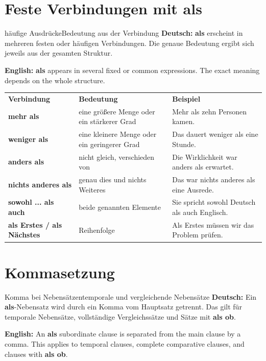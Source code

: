 \documentclass[a4paper,11pt]{article}
\newcommand{\GermanText}[1]{\textbf{Deutsch: }#1\par}
\newcommand{\EnglishText}[1]{{\small\color{SoftGray}\textbf{English: }#1\par}}
\begin{document}
    \section{Feste Verbindungen mit \glqq als\grqq}

        \begin{grammarentry}{häufige Ausdrücke}{Bedeutung aus der Verbindung}
            \GermanText{\textbf{als} erscheint in mehreren festen oder häufigen Verbindungen. Die genaue Bedeutung ergibt sich jeweils aus der gesamten Struktur.}
            \EnglishText{\textbf{als} appears in several fixed or common expressions. The exact meaning depends on the whole structure.}
        \end{grammarentry}

        \begin{longtable}{>{\bfseries}p{4.0cm}|p{5.5cm}|p{5.6cm}}
            \rowcolor{HeaderBlueDark}
            \color{white}\textbf{Verbindung} &
            \color{white}\textbf{Bedeutung} &
            \color{white}\textbf{Beispiel} \\
            mehr als & eine größere Menge oder ein stärkerer Grad & Mehr als zehn Personen kamen. \\
            weniger als & eine kleinere Menge oder ein geringerer Grad & Das dauert weniger als eine Stunde. \\
            anders als & nicht gleich, verschieden von & Die Wirklichkeit war anders als erwartet. \\
            nichts anderes als & genau dies und nichts Weiteres & Das war nichts anderes als eine Ausrede. \\
            sowohl ... als auch & beide genannten Elemente & Sie spricht sowohl Deutsch als auch Englisch. \\
            als Erstes / als Nächstes & Reihenfolge & Als Erstes müssen wir das Problem prüfen. \\
        \end{longtable}

    \section{Kommasetzung}

        \begin{grammarentry}{Komma bei Nebensätzen}{temporale und vergleichende Nebensätze}
            \GermanText{Ein \textbf{als}-Nebensatz wird durch ein Komma vom Hauptsatz getrennt. Das gilt für temporale Nebensätze, vollständige Vergleichssätze und Sätze mit \textbf{als ob}.}
            \EnglishText{An \textbf{als} subordinate clause is separated from the main clause by a comma. This applies to temporal clauses, complete comparative clauses, and clauses with \textbf{als ob}.}
        \end{grammarentry}
\end{document}
